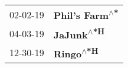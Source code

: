 \begin{supertabular}{p{0.25\columnwidth}p{0.75\columnwidth}}
 02-02-19 &  \textbf{Phil's Farm\textsuperscript{$\wedge$*}} \\
 04-03-19 &      \textbf{JaJunk\textsuperscript{$\wedge$*H}} \\
 12-30-19 &       \textbf{Ringo\textsuperscript{$\wedge$*H}} \\
\end{supertabular}
